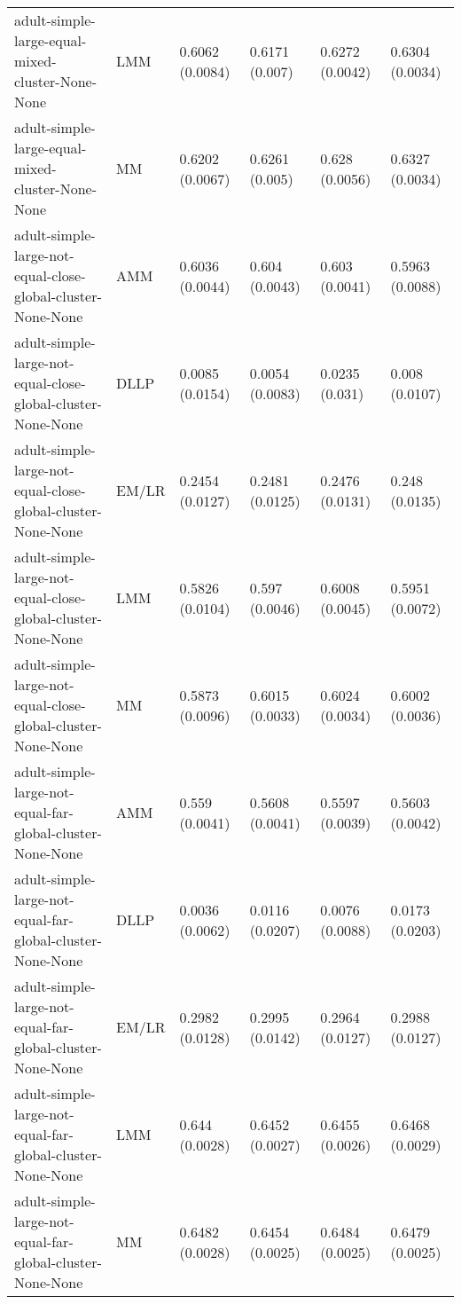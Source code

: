 \begin{longtable}{llllll}
                                       adult-simple-large-equal-mixed-cluster-None-None &       LMM & 0.6062 (0.0084) &   0.6171 (0.007) &   0.6272 (0.0042) &     0.6304 (0.0034) \\
                                       adult-simple-large-equal-mixed-cluster-None-None &        MM & 0.6202 (0.0067) &   0.6261 (0.005) &    0.628 (0.0056) &     0.6327 (0.0034) \\
                            adult-simple-large-not-equal-close-global-cluster-None-None &       AMM & 0.6036 (0.0044) &   0.604 (0.0043) &    0.603 (0.0041) &     0.5963 (0.0088) \\
                            adult-simple-large-not-equal-close-global-cluster-None-None &      DLLP & 0.0085 (0.0154) &  0.0054 (0.0083) &    0.0235 (0.031) &      0.008 (0.0107) \\
                            adult-simple-large-not-equal-close-global-cluster-None-None &     EM/LR & 0.2454 (0.0127) &  0.2481 (0.0125) &   0.2476 (0.0131) &      0.248 (0.0135) \\
                            adult-simple-large-not-equal-close-global-cluster-None-None &       LMM & 0.5826 (0.0104) &   0.597 (0.0046) &   0.6008 (0.0045) &     0.5951 (0.0072) \\
                            adult-simple-large-not-equal-close-global-cluster-None-None &        MM & 0.5873 (0.0096) &  0.6015 (0.0033) &   0.6024 (0.0034) &     0.6002 (0.0036) \\
                              adult-simple-large-not-equal-far-global-cluster-None-None &       AMM &  0.559 (0.0041) &  0.5608 (0.0041) &   0.5597 (0.0039) &     0.5603 (0.0042) \\
                              adult-simple-large-not-equal-far-global-cluster-None-None &      DLLP & 0.0036 (0.0062) &  0.0116 (0.0207) &   0.0076 (0.0088) &     0.0173 (0.0203) \\
                              adult-simple-large-not-equal-far-global-cluster-None-None &     EM/LR & 0.2982 (0.0128) &  0.2995 (0.0142) &   0.2964 (0.0127) &     0.2988 (0.0127) \\
                              adult-simple-large-not-equal-far-global-cluster-None-None &       LMM &  0.644 (0.0028) &  0.6452 (0.0027) &   0.6455 (0.0026) &     0.6468 (0.0029) \\
                              adult-simple-large-not-equal-far-global-cluster-None-None &        MM & 0.6482 (0.0028) &  0.6454 (0.0025) &   0.6484 (0.0025) &     0.6479 (0.0025) \\

\end{longtable}
